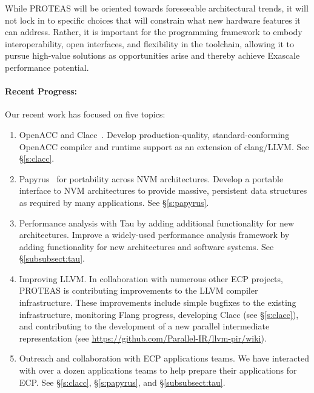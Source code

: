 While PROTEAS will be oriented towards foreseeable architectural trends, it will not lock in to specific choices that will constrain what new hardware features it can address. Rather, it is important for the programming framework to embody interoperability, open interfaces, and flexibility in the toolchain, allowing it to pursue high-value solutions as opportunities arise and thereby achieve Exascale performance potential. 

\paragraph{Recent Progress:}

Our recent work has focused on five topics:

\begin{enumerate}
    
    \item OpenACC and Clacc~\cite{clacc:2018:denny}. Develop production-quality, standard-conforming OpenACC compiler and runtime support as an extension of clang/LLVM. See \S\ref{s:clacc}.
    
    \item Papyrus~\cite{Kim:2017:DIP,Kim:2017:PHP} for portability across NVM architectures. 
    Develop a portable interface to NVM architectures to provide massive, persistent data structures as required by many applications.
    See \S\ref{s:papyrus}.
    
    \item Performance analysis with Tau by adding additional functionality for new architectures. 
    Improve a widely-used performance analysis framework by adding functionality for new architectures and software systems.
    See \S\ref{subsubsect:tau}.

    \item Improving LLVM. In collaboration with numerous other ECP projects, PROTEAS is contributing improvements to the LLVM compiler infrastructure. These improvements include simple bugfixes to the existing infrastructure, monitoring Flang progress, developing Clacc (see \S\ref{s:clacc}), and contributing to the development of a new parallel intermediate representation (see \url{https://github.com/Parallel-IR/llvm-pir/wiki}).
    
    \item Outreach and collaboration with ECP applications teams. 
    We have interacted with over a dozen applications teams to help prepare their applications for ECP. See \S\ref{s:clacc}, \S\ref{s:papyrus}, and \S\ref{subsubsect:tau}.
    
\end{enumerate}

